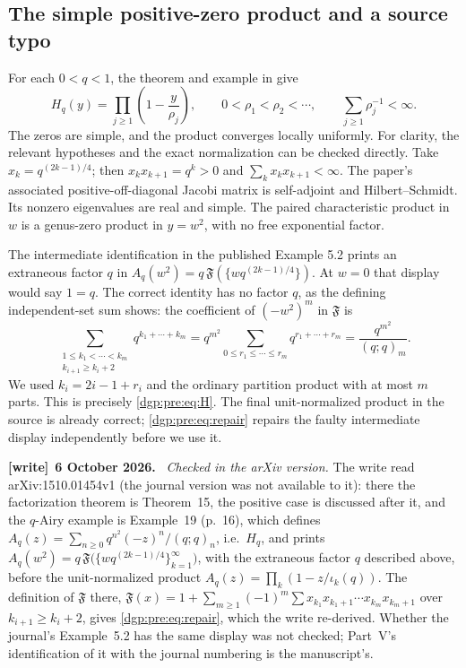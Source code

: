 \documentclass[11pt,letterpaper]{article}
\numberwithin{equation}{section}
\theoremstyle{remark}\newtheorem{remark}[theorem]{Remark}
\newenvironment{writenote}[1][]{\par\smallskip\begingroup\small
 \noindent\textbf{[write]}\if\relax\detokenize{#1}\relax\else~\textbf{#1.}\fi\ }%
 {\par\endgroup\smallskip}
\begin{document}
\subsection{The simple positive-zero product and a source typo}
For each $0<q<1$, the theorem and example in \cite[Theorem 5.2,
pp.~164--167, Example 5.2]{ss} give
\begin{equation}
 H_q(y)=\prod_{j\geq1}\left(1-\frac y{\rho_j}\right),
 \qquad 0<\rho_1<\rho_2<\cdots,\qquad
 \sum_{j\geq1}\rho_j^{-1}<\infty.
 \label{dgp:pre:eq:product}
\end{equation}
The zeros are simple, and the product converges locally uniformly.
For clarity, the relevant hypotheses and the exact normalization can
be checked directly. Take $x_k=q^{(2k-1)/4}$; then
$x_kx_{k+1}=q^k>0$ and $\sum_kx_kx_{k+1}<\infty$.
The paper's associated positive-off-diagonal Jacobi matrix is
self-adjoint and Hilbert--Schmidt. Its nonzero eigenvalues are real
and simple. The paired characteristic product in $w$ is a genus-zero
product in $y=w^2$, with no free exponential factor.

The intermediate identification in the published Example 5.2 prints
an extraneous factor $q$ in
$A_q(w^2)=q\,\mathfrak F(\{wq^{(2k-1)/4}\})$.
At $w=0$ that display would say $1=q$. The correct identity has no
factor $q$, as the defining independent-set sum shows: the coefficient
of $(-w^2)^m$ in $\mathfrak F$ is
\begin{equation}
 \sum_{\substack{1\leq k_1<\cdots<k_m\\k_{i+1}\geq k_i+2}}
       q^{k_1+\cdots+k_m}
 =q^{m^2}\sum_{0\leq r_1\leq\cdots\leq r_m}q^{r_1+\cdots+r_m}
 =\frac{q^{m^2}}{(q;q)_m}.
 \label{dgp:pre:eq:repair}
\end{equation}
We used $k_i=2i-1+r_i$ and the ordinary partition product with at most
$m$ parts. This is precisely \eqref{dgp:pre:eq:H}. The final unit-normalized
product in the source is already correct; \eqref{dgp:pre:eq:repair} repairs
the faulty intermediate display independently before we use it.
\begin{writenote}[6 October 2026]
\emph{Checked in the arXiv version.} The write read arXiv:1510.01454v1 \cite{ss} (the journal version was not available to it): there the factorization theorem is Theorem~15, the positive case is discussed after it, and the $q$-Airy example is Example~19 (p.~16), which defines $A_q(z)=\sum_{n\ge0}q^{n^2}(-z)^n/(q;q)_n$, i.e.\ $H_q$, and prints $A_q(w^2)=q\,\mathfrak F\bigl(\{wq^{(2k-1)/4}\}_{k=1}^\infty\bigr)$, with the extraneous factor $q$ described above, before the unit-normalized product $A_q(z)=\prod_k(1-z/\iota_k(q))$. The definition of $\mathfrak F$ there, $\mathfrak F(x)=1+\sum_{m\ge1}(-1)^m\sum x_{k_1}x_{k_1+1}\cdots x_{k_m}x_{k_m+1}$ over $k_{i+1}\ge k_i+2$, gives \eqref{dgp:pre:eq:repair}, which the write re-derived. Whether the journal's Example~5.2 has the same display was not checked; Part~V's identification of it with the journal numbering is the manuscript's.
\end{writenote}
\end{document}
